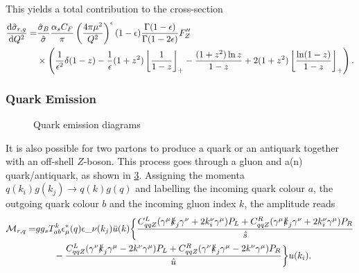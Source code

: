 \documentclass[../main.tex]{subfiles}
\begin{document}
This yields a total contribution to the cross-section
\begin{align}
  \nonumber
  \d[Q^2]{\hat\sigma_{r,g}} = & \frac{\hat\sigma_B}{\hat{\sigma}} \frac{\alpha_s C_F}{\pi} \pclosed{\frac{4\pi \mu^2}{Q^2}}^{\epsilon} (1-\epsilon) \frac{\Gamma(1-\epsilon)}{\Gamma(1-2\epsilon)} F^{\prime\prime}_Z \\
                              & \times \pclosed{\frac{1}{\epsilon^2} \delta(1-z) - \frac{1}{\epsilon} (1+z^2)\plusdist{\frac{1}{1-z}} - \frac{(1+z^2)\ln z}{1-z} + 2(1+z^2)\plusdist{\frac{\ln(1-z)}{1-z}}}.
\end{align}

\subsubsection*{Quark Emission}
\begin{figure}[ht!]
  \centering
  \begin{subfigure}{0.49\textwidth}
    \centering
    \caption{}
    \label{pc:subfig:quark_emission_s}
  \end{subfigure}
  \begin{subfigure}{0.49\textwidth}
    \centering
    \caption{}
    \label{pc:subfig:quark_emission_t}
  \end{subfigure}
  \caption{Quark emission diagrams}
  \label{pc:fig:quark_emission}
\end{figure}
It is also possible for two partons to produce a quark or an antiquark together with an off-shell \(Z\)-boson.
This process goes through a gluon and a(n) quark/antiquark, as shown in \cref{pc:fig:quark_emission}.
Assigning the momenta \(q(k_i) g(k_j) \to q(k) g(q)\) and labelling the incoming quark colour \(a\), the outgoing quark colour \(b\) and the incoming gluon index \(k\), the amplitude reads
\begin{align}
  \nonumber
  \M_{r,q} = & g g_s T_{ab}^k \epsilon_\mu^\ast(q) \epsilon\_\nu(k_j) \bar{u}(k) \biggl\{
  \frac{C_{qqZ}^L (\gamma\^\mu \slashed{k}_j \gamma\^\nu + 2k_i^\nu \gamma\^\mu )P_L + C_{qqZ}^R (\gamma\^\mu \slashed{k}_j \gamma\^\nu + 2k_i^\nu \gamma\^\mu )P_R }{\hat{s}}                     \\
             & \qquad - \frac{C_{qqZ}^L (\gamma\^\nu \slashed{k}_j \gamma\^\mu - 2k\^\nu \gamma\^\mu )P_L + C_{qqZ}^R (\gamma\^\nu \slashed{k}_j \gamma\^\mu - 2k\^\nu \gamma\^\mu )P_R }{\hat{u}}
  \biggr\}u(k_i).
\end{align}
\end{document}
